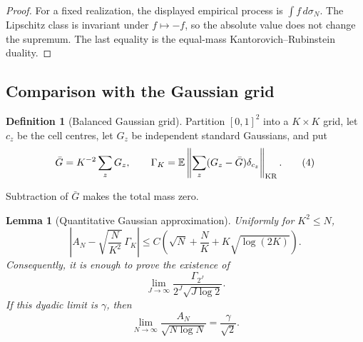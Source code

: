 \documentclass{smfart}
\newtheorem{lemma}[theorem]{Lemma}
\theoremstyle{definition}
\newtheorem{definition}[theorem]{Definition}
\newcommand{\1}{\mathbf 1}
\begin{document}
\begin{proof}
For a fixed realization, the displayed empirical process is
$\int f\,d\sigma_ N$. The Lipschitz class is invariant under $f\mapsto-f$,
so the absolute value does not change the supremum. The last equality is
the equal-mass Kantorovich--Rubinstein duality.

\end{proof}

\subsection{Comparison with the Gaussian grid}

\begin{definition}[Balanced Gaussian grid]\label{def:gaussian-grid}
Partition $[0,1]^2$ into a $K\times K$ grid, let $c_ z$ be the cell
centres, let $G_ z$ be independent standard Gaussians, and put
\begin{equation}
\bar G=K^{-2}\sum_ zG_ z,\qquad
\Gamma_ K=\mathbb E\left\|
\sum_ z(G_ z-\bar G)\delta_ {c_ z}\right\|_ {\rm KR}.
\tag{4}
\end{equation}

Subtraction of $\bar G$ makes the total mass zero.

\end{definition}

\begin{lemma}[Quantitative Gaussian approximation]\label{lem:gaussianization-dyadic}
Uniformly for $K^2\leq N$,
\begin{equation}
\left|A_ N-\sqrt{\frac N{K^2}}\,\Gamma_ K\right|
\leq C\left(\sqrt N+\frac NK+K\sqrt{\log(2K)}\right).
\tag{5}
\end{equation}
Consequently, it is enough to prove the existence of
\begin{equation}
\lim_ {J\to\infty}
\frac{\Gamma_ {2^J}}{2^J\sqrt{J\log2}}.
\tag{6}
\end{equation}
If this dyadic limit is $\gamma$, then
\begin{equation}
\lim_ {N\to\infty}\frac{A_ N}{\sqrt{N\log N}}
=\frac\gamma{\sqrt2}.
\tag{7}
\end{equation}

\end{lemma}
\end{document}
